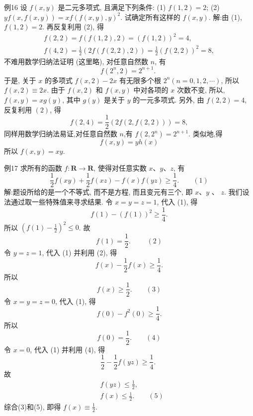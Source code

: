 例16 设 $f(x, y)$ 是二元多项式, 且满足下列条件:
(1) $f(1,2)=2$;
(2) $y f(x, f(x, y))=x f(f(x, y), y)^2$.
试确定所有这样的 $f(x, y)$.
解:由 (1), $f(1,2)=2$. 再反复利用 (2), 得
$$
\begin{gathered}
f(2,2)=f(f(1,2), 2)=(f(1,2))^2=4, \\
f(4,2)=\frac{1}{2}(2 f(f(2,2), 2))=\frac{1}{2}(f(2,2))^2=8,
\end{gathered}
$$
不难用数学归纳法证明 (这里略), 对任意自然数 $n$, 有
$$
f\left(2^n, 2\right)=2^{n+1} \text {. }
$$
于是, 关于 $x$ 的多项式 $f(x, 2)-2 x$ 有无限多个根 $2^n(n=0,1,2, \cdots)$, 所以 $f(x, 2) \equiv 2 x$.
由于 $f(x, 2)$ 和 $f(x, y)$ 中对各项的 $x$ 次数不变, 所以, $f(x, y)=x g(y)$, 其中 $g(y)$ 是关于 $y$ 的一元多项式.
另外, 由 $f(2,2)=4$, 反复利用 $(2)$, 得
$$
f(2,4)=\frac{1}{2}(2 f(2, f(2,2)))=8,
$$
同样用数学归纳法易证,对任意自然数 $n$,有 $f\left(2,2^n\right)=2^{n+1}$.
类似地,得
$$
f(x, y)=y h(x)
$$
所以 $f(x, y)=x y$.



例17 求所有的函数 $f: \mathbf{R} \rightarrow \mathbf{R}$, 使得对任意实数 $x 、 y 、 z$, 有
$$
\frac{1}{2} f(x y)+\frac{1}{2} f(x z)-f(x) f(y z) \geqslant \frac{1}{4} . \quad\quad (1)
$$
解:题设所给的是一个不等式, 而不是方程, 而且变元有三个, 即 $x 、 y$ 、 $z$. 我们设法通过取一些特殊值来寻求结果.
令 $x=y=z=1$, 代入 (1), 得
$$
f(1)-(f(1))^2 \geqslant \frac{1}{4} .
$$
所以 $\left(f(1)-\frac{1}{2}\right)^2 \leqslant 0$.
故
$$
f(1)=\frac{1}{2} \text {. }  \quad\quad (2)
$$
令 $y=z=1$, 代入 (1) 并利用 (2), 得
$$
f(x)-\frac{1}{2} f(x) \geqslant \frac{1}{4} .
$$
所以
$$
f(x) \geqslant \frac{1}{2} .  \quad\quad (3)
$$
令 $x=y=z=0$, 代入 (1), 得
$$
f(0)-f^2(0) \geqslant \frac{1}{4} .
$$
所以
$$
f(0)=\frac{1}{2} . \quad\quad (4)
$$
令 $x=0$, 代入 (1) 并利用 (4), 得
$$
\frac{1}{2}-\frac{1}{2} f(y z) \geqslant \frac{1}{4} \text {. }
$$
故
$$
\begin{aligned}
& f(y z) \leqslant \frac{1}{2}, \\
& f(x) \leqslant \frac{1}{2} .  \quad\quad (5)
\end{aligned}
$$
综合(3)和(5), 即得 $f(x) \equiv \frac{1}{2}$.



